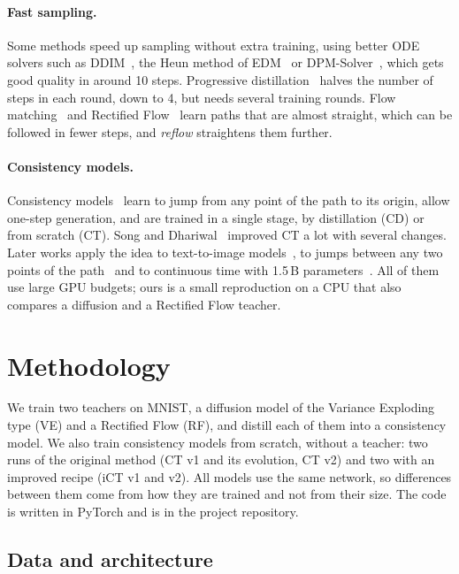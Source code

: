 \documentclass{article}
\begin{document}
\paragraph{Fast sampling.} Some methods speed up sampling without extra
training, using better ODE solvers such as DDIM~\cite{song2021ddim}, the Heun
method of EDM~\cite{karras2022edm} or DPM-Solver~\cite{lu2022dpmsolver}, which
gets good quality in around 10 steps. Progressive
distillation~\cite{salimans2022progressive} halves the number of steps in each
round, down to 4, but needs several training rounds. Flow
matching~\cite{lipman2023flow} and Rectified Flow~\cite{liu2023flow} learn
paths that are almost straight, which can be followed in fewer steps, and
\emph{reflow} straightens them further.

\paragraph{Consistency models.} Consistency
models~\cite{song2023consistency} learn to jump from any point of the path to
its origin, allow one-step generation, and are trained in a single stage, by
distillation (CD) or from scratch (CT). Song and
Dhariwal~\cite{song2024improved} improved CT a lot with several changes. Later
works apply the idea to text-to-image models~\cite{luo2023lcm}, to jumps
between any two points of the path~\cite{kim2024ctm} and to continuous time
with 1.5\,B parameters~\cite{lu2025scm}. All of them use large GPU budgets; ours
is a small reproduction on a CPU that also compares a diffusion and a Rectified
Flow teacher.

\section{Methodology}
\label{sec:methodology}

We train two teachers on MNIST, a diffusion model of the Variance Exploding
type (VE) and a Rectified Flow (RF), and distill each of them into a
consistency model. We also train consistency models from scratch, without a
teacher: two runs of the original method (CT v1 and its evolution, CT v2) and
two with an improved recipe (iCT v1 and v2). All models use the same network, so differences between them come from
how they are trained and not from their size. The code is written in PyTorch
and is in the project repository.

\subsection{Data and architecture}
\label{sec:data}
\end{document}
